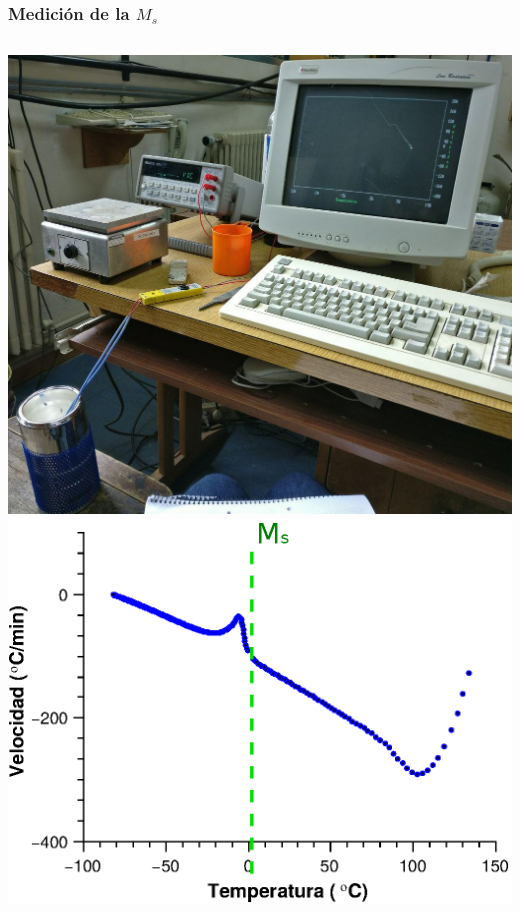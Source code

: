 \documentclass[usenames,dvipsnames]{beamer}
\begin{document}
\begin{frame}
\frametitle{Medición de la $M_s$}

\begin{columns}
 \includegraphics[width=\textwidth]{img/proceso/esquema_medicion_ms.jpg}
\includegraphics[width=\textwidth]{img/proceso/Ms1.eps}


 \end{columns}


 
\end{frame}
\end{document}
